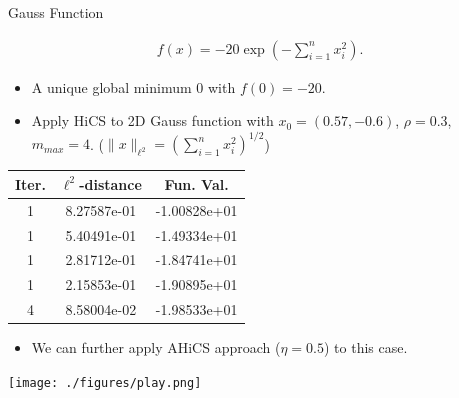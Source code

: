 \documentclass{beamer}
\newcommand{\bmx}{x}
\begin{document}
\begin{frame}{Gauss Function}
\footnotesize{
\begin{align*}
	f(\bmx) = -20 \exp\left( -\sum_{i=1}^n x_i^2 \right).
\end{align*}
\begin{itemize}
	\item A unique global minimum $0$ with $f(0)=-20$.
\end{itemize}
}
\pause
\footnotesize{
	\begin{itemize}
		\item Apply HiCS to 2D Gauss function with $x_0 = (0.57, -0.6)$,
			$\rho=0.3$, $m_{max}=4$. ($\|x\|_{\ell^2}=(\sum_{i=1}^n x_i^2)^{1/2}$)
\end{itemize}
}
\vspace{-0.2cm}
\begin{table}[!htbp]
\begin{center}
\footnotesize{
\begin{tabular}{|c|c|c|}
 \hline
 Iter. & $\ell^2$-distance  &  Fun. Val.
 \\\hline
  1 & 8.27587e-01 & -1.00828e+01
 \\ \hline                                                                                                                                       
  1 & 5.40491e-01 & -1.49334e+01
  \\ \hline  
  1 & 2.81712e-01 & -1.84741e+01  
    \\ \hline  
  1 & 2.15853e-01 & -1.90895e+01  
    \\ \hline  
  4 & 8.58004e-02 & -1.98533e+01  
 \\\hline
\end{tabular}
}
\end{center}
\end{table}
\vspace{-0.3cm}
\pause
\footnotesize{
	\begin{itemize}
		\item We can further apply AHiCS approach ($\eta=0.5$) to this case.
	\end{itemize}
\vspace{-0.3cm}
\begin{center}
	\hspace*{-0.6cm}\texttt{[image: ./figures/play.png]}
\end{center}
}
\end{frame}
\end{document}
